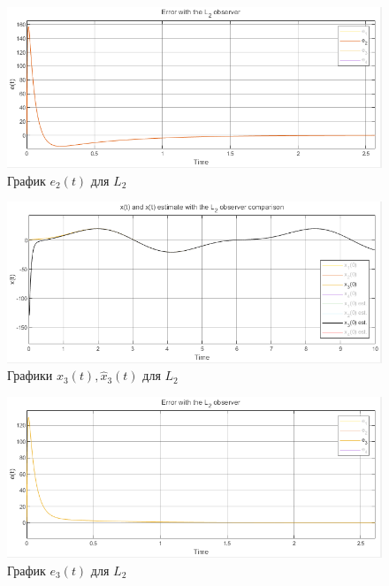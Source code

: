 \documentclass[a4paper, 12pt]{article}
\begin{document}
    \newpage
    \vspace*{5mm}
    \begin{figure}[H]
        \centering
        \includegraphics[scale=0.7]{2task_e2_L2.png}
        \captionsetup{skip=0pt}
        \caption{График $e_2(t)$ для $L_2$}
        \label{fig:2task_e2_L2}
    \end{figure}
    \begin{figure}[H]
        \centering
        \includegraphics[scale=0.7]{2task_x3comp_L2.png}
        \captionsetup{skip=0pt}
        \caption{Графики $x_3(t),\hat{x}_3(t)$ для $L_2$}
        \label{fig:2task_x3comp_L2}
    \end{figure}
    \begin{figure}[H]
        \centering
        \includegraphics[scale=0.7]{2task_e3_L2.png}
        \captionsetup{skip=0pt}
        \caption{График $e_3(t)$ для $L_2$}
        \label{fig:2task_e3_L2}
    \end{figure}
\end{document}
